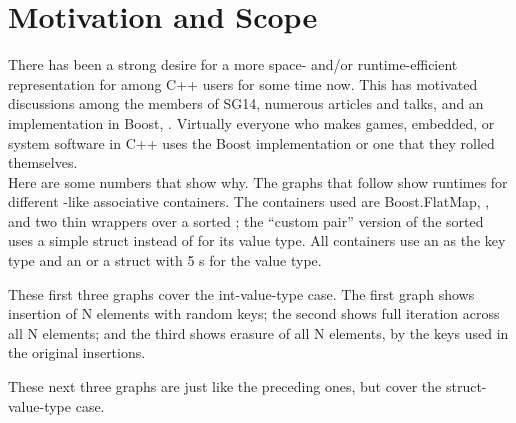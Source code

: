 \section{Motivation and Scope}

There has been a strong desire for a more space- and/or runtime-efficient
representation for  among C++ users for some time now.  This has
motivated discussions among the members of SG14, numerous articles and talks,
and an implementation in Boost, .  Virtually
everyone who makes games, embedded, or system software in C++ uses the Boost
implementation or one that they rolled themselves.\\

Here are some numbers that show why.  The graphs that follow show runtimes for
different -like associative containers.  The containers used are
Boost.FlatMap, , and two thin wrappers over a sorted
; the ``custom pair'' version of the sorted
 uses a simple struct instead of  for its
value type.  All containers use an  as the key type and an
 or a struct with 5 s for the value type.

These first three graphs cover the int-value-type case.  The first
graph shows insertion of N elements with random keys; the second shows full
iteration across all N elements; and the third shows erasure of all N
elements, by the keys used in the original insertions.


These next three graphs are just like the preceding ones, but cover the
struct-value-type case.

